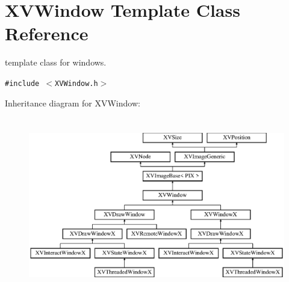 \hypertarget{class_XVWindow}{
\section{XVWindow  Template Class Reference}
\label{XVWindow}
}
template class for windows. 


{\tt \#include $<$XVWindow.h$>$}

Inheritance diagram for XVWindow:\begin{figure}[H]
\begin{center}
\leavevmode
\includegraphics[height=7.72414cm]{class_XVWindow}
\end{center}
\end{figure}
